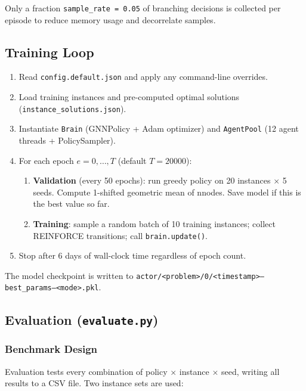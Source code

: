 Only a fraction \texttt{sample\_rate = 0.05} of branching decisions is collected per episode to reduce memory usage and decorrelate samples.

\subsection{Training Loop}

\begin{enumerate}
    \item Read \texttt{config.default.json} and apply any command-line overrides.
    \item Load training instances and pre-computed optimal solutions (\texttt{instance\_solutions.json}).
    \item Instantiate \texttt{Brain} (GNNPolicy + Adam optimizer) and \texttt{AgentPool} (12 agent threads + PolicySampler).
    \item For each epoch $e = 0, \ldots, T$ (default $T = 20000$):
    \begin{enumerate}
        \item \textbf{Validation} (every 50 epochs): run greedy policy on 20 instances $\times$ 5 seeds. Compute 1-shifted geometric mean of nnodes. Save model if this is the best value so far.
        \item \textbf{Training}: sample a random batch of 10 training instances; collect REINFORCE transitions; call \texttt{brain.update()}.
    \end{enumerate}
    \item Stop after 6 days of wall-clock time regardless of epoch count.
\end{enumerate}

The model checkpoint is written to \texttt{actor/<problem>/0/<timestamp>--best\_params--<mode>.pkl}.

\subsection{Evaluation (\texttt{evaluate.py})}

\subsubsection{Benchmark Design}

Evaluation tests every combination of policy $\times$ instance $\times$ seed, writing all results to a CSV file. Two instance sets are used:

